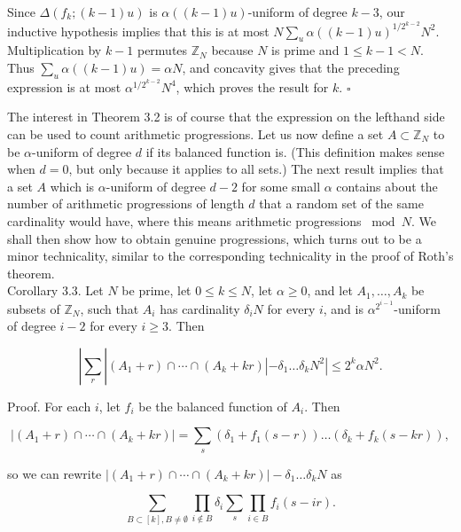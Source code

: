 \documentclass[10pt]{article}
\begin{document}
Since $\Delta\left(f_{k} ;(k-1) u\right)$ is $\alpha((k-1) u)$-uniform of degree $k-3$, our inductive hypothesis implies that this is at most $N \sum_{u} \alpha((k-1) u)^{1 / 2^{k-2}} N^{2}$.  Multiplication by $k-1$ permutes $\mathbb Z_N$ because $N$ is prime and $1\leqslant k-1<N$.  Thus $\sum_{u} \alpha((k-1) u)=\alpha N$, and concavity gives that the preceding expression is at most $\alpha^{1 / 2^{k-2}} N^{4}$, which proves the result for $k$. \(\square\)

The interest in Theorem 3.2 is of course that the expression on the lefthand side can be used to count arithmetic progressions. Let us now define a set $A \subset \mathbb{Z}_{N}$ to be $\alpha$-uniform of degree $d$ if its balanced function is. (This definition makes sense when $d=0$, but only because it applies to all sets.) The next result implies that a set $A$ which is $\alpha$-uniform of degree $d-2$ for some small $\alpha$ contains about the number of arithmetic progressions of length $d$ that a random set of the same cardinality would have, where this means arithmetic progressions $\bmod N$. We shall then show how to obtain genuine progressions, which turns out to be a minor technicality, similar to the corresponding technicality in the proof of Roth's theorem.\\
Corollary 3.3. Let $N$ be prime, let $0\leqslant k\leqslant N$, let $\alpha\geqslant0$, and let $A_{1}, \ldots, A_{k}$ be subsets of $\mathbb{Z}_{N}$, such that $A_{i}$ has cardinality $\delta_{i} N$ for every $i$, and is $\alpha^{2^{i-1}}$-uniform of degree $i-2$ for every $i \geqslant 3$. Then

$$
\left|\sum_{r}\right|\left(A_{1}+r\right) \cap \cdots \cap\left(A_{k}+k r\right)\left|-\delta_{1} \ldots \delta_{k} N^{2}\right| \leqslant 2^{k} \alpha N^{2} .
$$

Proof. For each $i$, let $f_{i}$ be the balanced function of $A_{i}$. Then

$$
\left|\left(A_{1}+r\right) \cap \cdots \cap\left(A_{k}+k r\right)\right|=\sum_{s}\left(\delta_{1}+f_{1}(s-r)\right) \ldots\left(\delta_{k}+f_{k}(s-k r)\right),
$$

so we can rewrite $\left|\left(A_{1}+r\right) \cap \cdots \cap\left(A_{k}+k r\right)\right|-\delta_{1} \ldots \delta_{k} N$ as

$$
\sum_{B \subset[k], B \neq \emptyset} \prod_{i \notin B} \delta_{i} \sum_{s} \prod_{i \in B} f_{i}(s-i r) .
$$
\end{document}
